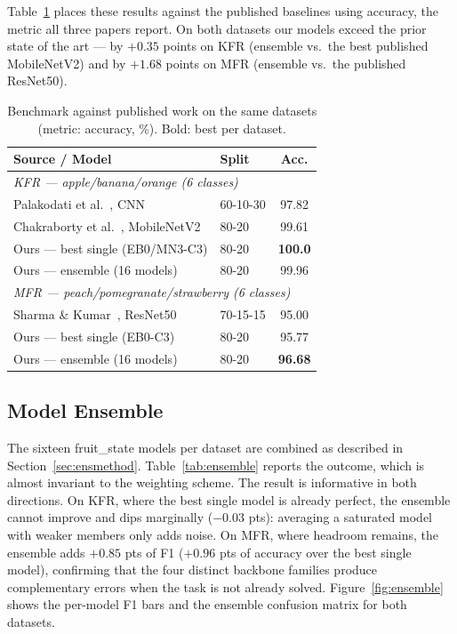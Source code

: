 \documentclass[conference]{IEEEtran}
\begin{document}
Table~\ref{tab:benchmark} places these results against the published
baselines using accuracy, the metric all three papers report.
On both datasets our models exceed the prior state of the art ---
by $+0.35$ points on KFR (ensemble vs.\ the best published MobileNetV2)
and by $+1.68$ points on MFR (ensemble vs.\ the published ResNet50).

\begin{table}[h]
\centering
\caption{Benchmark against published work on the same datasets
(metric: accuracy, \%). Bold: best per dataset.}
\label{tab:benchmark}
\setlength{\tabcolsep}{3pt}
\begin{tabular}{llc}
\toprule
\textbf{Source / Model} & \textbf{Split} & \textbf{Acc.} \\
\midrule
\multicolumn{3}{l}{\textit{KFR --- apple/banana/orange (6 classes)}} \\
Palakodati et al.~\cite{palakodati2020fresh}, CNN          & 60-10-30 & 97.82 \\
Chakraborty et al.~\cite{chakraborty2021implementation}, MobileNetV2 & 80-20 & 99.61 \\
Ours --- best single (EB0/MN3-C3)                          & 80-20 & \textbf{100.0} \\
Ours --- ensemble (16 models)                              & 80-20 & 99.96 \\
\midrule
\multicolumn{3}{l}{\textit{MFR --- peach/pomegranate/strawberry (6 classes)}} \\
Sharma \& Kumar~\cite{sharma2025automated}, ResNet50       & 70-15-15 & 95.00 \\
Ours --- best single (EB0-C3)                              & 80-20 & 95.77 \\
Ours --- ensemble (16 models)                              & 80-20 & \textbf{96.68} \\
\bottomrule
\end{tabular}
\end{table}

\subsection{Model Ensemble}
\label{sec:ensresults}

The sixteen fruit\_state models per dataset are combined as described in
Section~\ref{sec:ensmethod}.
Table~\ref{tab:ensemble} reports the outcome, which is almost invariant to
the weighting scheme.
The result is informative in both directions.
On KFR, where the best single model is already perfect, the ensemble
cannot improve and dips marginally ($-0.03$ pts): averaging a saturated
model with weaker members only adds noise.
On MFR, where headroom remains, the ensemble adds $+0.85$ pts of F1
($+0.96$ pts of accuracy over the best single model), confirming that the
four distinct backbone families produce complementary errors when the task
is not already solved.
Figure~\ref{fig:ensemble} shows the per-model F1 bars and the ensemble
confusion matrix for both datasets.
\end{document}
